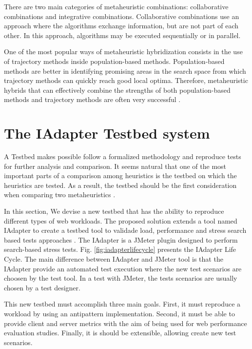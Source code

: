 \documentclass[times]{stvrauth}
\begin{document}
There are two main categories of metaheuristic combinations: collaborative combinations and integrative combinations. Collaborative combinations use an approach where the algorithms exchange information, but are not part of each other. In this approach, algorithms may be executed sequentially or in parallel. 

One of the most popular ways of metaheuristic hybridization consists in the use of trajectory methods inside population-based methods. Population-based methods are better in identifying promising areas in the search space from which trajectory methods can quickly reach good local optima. Therefore, metaheuristic hybrids that can effectively combine the strengths of both population-based methods and trajectory methods are often very successful \cite{raidl2010metaheuristic}.

\section{The IAdapter Testbed system}

A Testbed makes possible follow a formalized methodology and reproduce tests for further analysis and comparison. It seems natural that one of the most important parts of a comparison among heuristics is the testbed on which the heuristics are tested. As a result, the testbed should be the first consideration when comparing two metaheuristics \cite{GendreauMichelandPotvin2010}. 

In this section, We devise a new testbed that has the ability to reproduce different types of web workloads.  The proposed solution extends a tool named IAdapter to create a testbed tool to validade load, performance and stress search based tests approaches \cite{Gois2016}. The IAdapter is a JMeter plugin designed to perform search-based stress tests. Fig. \ref{fig:iadapterlifecycle} presents the IAdapter Life Cycle. The main difference between IAdapter and JMeter tool is that the IAdapter provide an automated test execution where the new test scenarios are choosen by the test tool.  In a test with JMeter, the tests scenarios are usually chosen by a test designer.

This new testbed must accomplish three main goals. First, it must reproduce a workload by using an antipattern implementation. Second, it must be able to provide client and server metrics with the aim of being used for web performance evaluation studies. Finally, it is should be extensible, allowing create new test scenarios.
\end{document}
